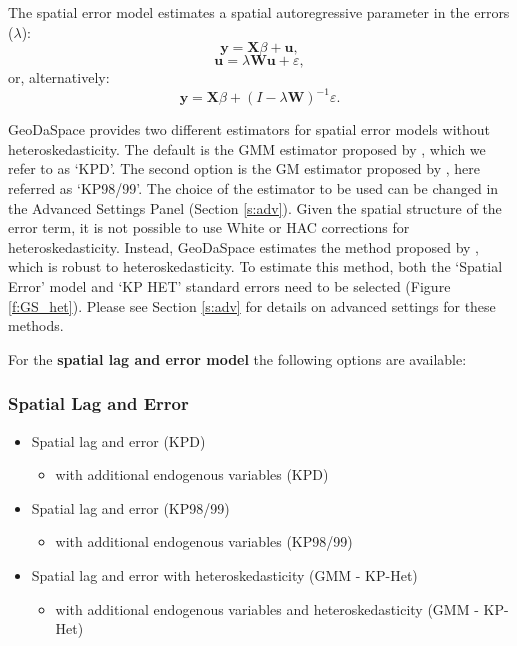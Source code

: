 \documentclass{article}
\begin{document}
The spatial error model estimates a spatial autoregressive parameter in the errors ($\lambda$):
\begin{equation}
\mathbf{y} =  \mathbf{X}\beta + \mathbf{u},
\end{equation}
\begin{equation}
\mathbf{u} =  \lambda \mathbf{W} \mathbf{u} + \varepsilon,
\end{equation}
or, alternatively:
\begin{equation}
\mathbf{y} =  \mathbf{X}\beta + (I - \lambda \mathbf{W})^{-1} \varepsilon.
\end{equation}

GeoDaSpace provides two different estimators for spatial error models without heteroskedasticity. The default is the GMM estimator proposed by \citet{Drukker10}, which we refer to as `KPD'. The second option is the GM estimator proposed by \citet{Kelejian98,Kelejian99}, here referred as `KP98/99'. The choice of the estimator to be used can be changed in the Advanced Settings Panel (Section \ref{s:adv}). Given the spatial structure of the error term, it is not possible to use White or HAC corrections for heteroskedasticity. Instead, GeoDaSpace estimates the method proposed by \citet{Arraiz10}, which is robust to heteroskedasticity. To estimate this method, both the `Spatial Error' model and `KP HET' standard errors need to be selected (Figure \ref{f:GS_het}). Please see Section \ref{s:adv} for details on advanced settings for these methods.
\FloatBarrier

For the \textbf{spatial lag and error model} the following options are available:

\subsubsection*{Spatial Lag and Error}
\begin{itemize}
\item Spatial lag and error (KPD)
	\begin{itemize}
	\item with additional endogenous variables (KPD)
	\end{itemize}
\item Spatial lag and error (KP98/99)
	\begin{itemize}
	\item with additional endogenous variables (KP98/99)
	\end{itemize}
\item Spatial lag and error with heteroskedasticity (GMM - KP-Het)
	\begin{itemize}
	\item with additional endogenous variables and heteroskedasticity (GMM - KP-Het)
	\end{itemize}
\end{itemize}
\end{document}
